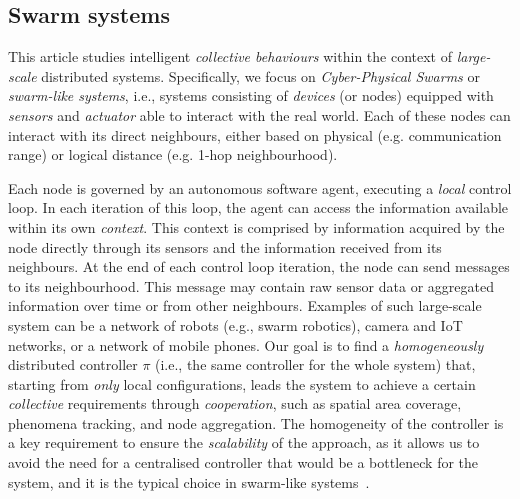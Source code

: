 \documentclass[conference]{IEEEtran}
\begin{document}
\subsection{Swarm systems}
This article studies intelligent \emph{collective behaviours} within the context of \emph{large-scale} distributed systems.
 Specifically, we focus on \emph{Cyber-Physical Swarms} or \emph{swarm-like systems}, i.e.,  systems consisting of \emph{devices} (or nodes) equipped with \emph{sensors} and \emph{actuator} able to interact with the real world.
 Each of these nodes can interact with its direct neighbours, either based on physical (e.g. communication range) or logical distance (e.g. 1-hop neighbourhood).
 
%
Each node is governed by an autonomous software agent, executing a \emph{local} control loop. In each iteration of this loop, the agent can access the information available within its own \emph{context}. This context is comprised by information acquired by the node directly through its sensors and the information received from its neighbours. 
%
At the end of each control loop iteration, the node can send messages to its neighbourhood. This message may contain raw sensor data or aggregated information over time or from other neighbours.
%
Examples of such large-scale system can be a network of robots (e.g., swarm robotics), camera and IoT networks, or a network of mobile phones.
%
Our goal is to find a \emph{homogeneously} distributed controller $\pi$ (i.e., the same controller for the whole system) that, 
 starting from \emph{only} local configurations, leads 
 the system to achieve a certain \emph{collective} requirements through \emph{cooperation}, 
 such as spatial area coverage, phenomena tracking, and node aggregation.
%
The homogeneity of the controller is a key requirement to ensure the \emph{scalability} of the approach, 
 as it allows us to avoid the need for a centralised controller that would be a bottleneck for the system,
 and it is the typical choice in swarm-like systems~\cite{brambilla2013swarm,yang2021many,pmlr-v80-yang18d,DBLP:conf/aaai/ZhengYCZZWY18}.
%
\end{document}
